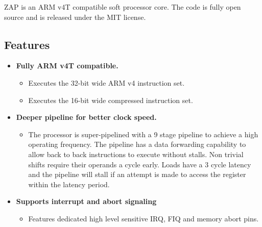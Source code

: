 \documentclass[11pt]{article}
\begin{document}
ZAP is an ARM{\textregistered} v4T compatible soft processor core. The code is
fully open source and is released under the MIT license.


\subsection{Features}

\begin{itemize}

\item \textbf{Fully ARM v4T compatible.}

        \begin{itemize}

        \item Executes the 32-bit wide ARM v4 instruction set.

        \item Executes the 16-bit wide compressed instruction set.

        \end{itemize}

\item \textbf{Deeper pipeline for better clock speed.}

        \begin{itemize}

        \item The processor is super-pipelined with a 9 stage pipeline to 
        achieve a high operating frequency. The pipeline has a data forwarding 
        capability to allow back to back instructions to execute without 
        stalls. Non trivial shifts require their operands a cycle early. Loads 
        have a 3 cycle latency and the pipeline will stall if an attempt is 
        made to access the register within the latency period.

        \end{itemize}

\item{\textbf{Supports interrupt and abort signaling}}

        \begin{itemize}

        \item Features dedicated high level sensitive IRQ, FIQ and memory abort 
        pins.

        \end{itemize}


\end{itemize}
\end{document}
